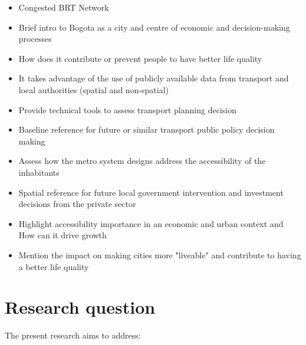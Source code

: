 \documentclass[12pt, a4paper]{report}
\begin{document}
\begin{itemize}

\item Congested BRT Network

\item Brief intro to Bogota as a city and centre of economic and decision-making processes
\item How does it contribute or prevent people to have better life quality
\item It takes advantage of the use of publicly available data from transport and local authorities (spatial and non-spatial)
  \item Provide technical tools to assess transport planning decision
  \item Baseline reference for future or similar transport public policy decision making
  \item Assess how the metro system designs address the accessibility of the inhabitants
  \item Spatial reference for future local government intervention and investment decisions from the private sector
  \item Highlight accessibility importance in an economic and urban context and How can it drive growth
  \item Mention the impact on making cities more "liveable" and contribute to having a better life quality
\end{itemize}

\section{Research question}

The present research aims to address:





\end{document}

